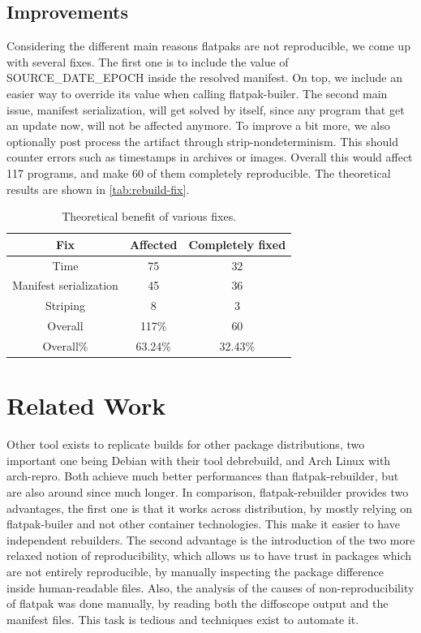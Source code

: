 \documentclass[a4paper,11pt,oneside]{report}
\theoremstyle{definition}
\newcommand{\sysname}{flatpak-rebuilder\xspace}
\newcommand{\fp}{flatpak\xspace}
\newcommand{\fb}{flatpak-builer\xspace}
\newcommand{\sde}{SOURCE\_DATE\_EPOCH\xspace}
\begin{document}
\section{Improvements}
Considering the different main reasons flatpaks are not reproducible, we come
up with several fixes. The first one is to include the value of \sde inside the
resolved manifest. On top, we include an easier way to override its value when
calling \fb.
The second main issue, manifest serialization, will get solved by itself, since
any program that get an update now, will not be affected anymore.
To improve a bit more, we also optionally post process the artifact through
strip-nondeterminism. This should counter errors such as timestamps in archives
or images.
Overall this would affect 117 programs, and make 60 of them completely
reproducible. The theoretical results are shown in \autoref{tab:rebuild-fix}.

\begin{table}[h]
    \centering
        \begin{tabular}{|c|c|c|}
            \hline
            Fix & Affected & Completely fixed\\
            \hline
            Time & 75 & 32\\
            \hline
            Manifest serialization & 45 & 36 \\
            \hline
            Striping & 8 & 3\\
            \hline
            Overall & 117\% & 60\\
            \hline
            Overall\% & 63.24\% & 32.43\%\\
            \hline
        \end{tabular}
    \caption{Theoretical benefit of various fixes.}
    \label{tab:rebuild-fix}
\end{table}

\chapter{Related Work}
\label{chap:relw}

Other tool exists to replicate builds for other package distributions, two
important one being Debian with their tool debrebuild, and Arch Linux with
arch-repro. Both achieve much better performances than \sysname, but are also
around since much longer. In comparison, \sysname provides two advantages, the
first one is that it works across distribution, by mostly relying on \fb and
not other container technologies. This make it easier to have independent
rebuilders. The second advantage is the introduction of the two more relaxed
notion of reproducibility, which allows us to have trust in packages which are
not entirely reproducible, by manually inspecting the package difference inside
human-readable files.
Also, the analysis of the causes of non-reproducibility of \fp was done
manually, by reading both the diffoscope output and the manifest files. This
task is tedious and techniques exist to automate it.
\end{document}
